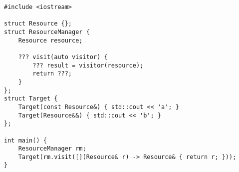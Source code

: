 \begin{lstlisting}[title=\href{https://godbolt.org/z/sjgP4b}{\texttt{godbolt.org/z/sjgP4b}}]
#include <iostream>

struct Resource {};
struct ResourceManager {
    Resource resource;

    ??? visit(auto visitor) {
        ??? result = visitor(resource);
        return ???;
    }
};
struct Target {
    Target(const Resource&) { std::cout << 'a'; }
    Target(Resource&&) { std::cout << 'b'; }
};

int main() {
    ResourceManager rm;
    Target(rm.visit([](Resource& r) -> Resource& { return r; }));
}
\end{lstlisting}
